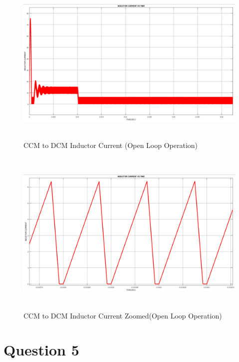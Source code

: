 \documentclass[oneside,12pt]{article}
\begin{document}
\begin{figure}[H]
	\centering
	\includegraphics[width=14cm, height=8cm]{Q4/yeni/IL}
	\caption{CCM to DCM Inductor Current (Open Loop Operation)}
	\label{fig:il}
\end{figure}
\begin{figure}[H]
	\centering
	\includegraphics[width=14cm, height=8cm]{Q4/yeni/ILZOOM_DCM}
	\caption{CCM to DCM Inductor Current Zoomed(Open Loop Operation)}
	\label{fig:ilzoomdcm}
\end{figure}




\newpage\section{Question 5}
\end{document}
